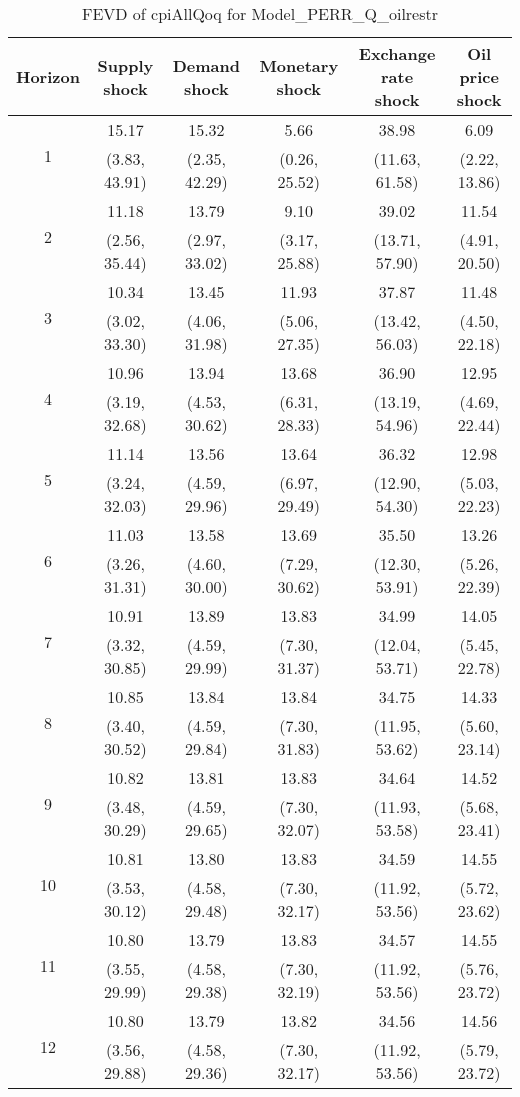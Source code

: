 \documentclass{article}
\begin{document}
\begin{table}
	\footnotesize
	\caption{FEVD of cpiAllQoq for Model_PERR_Q_oilrestr}
	\begin{tabular}{cccccc}
		Horizon & Supply shock & Demand shock & Monetary shock & Exchange rate shock & Oil price shock\\ \hline
		\multirow{2}{*}{1} & 15.17 & 15.32 & 5.66 & 38.98 & 6.09\\
		 & (3.83, 43.91) & (2.35, 42.29) & (0.26, 25.52) & (11.63, 61.58) & (2.22, 13.86)\\
		\multirow{2}{*}{2} & 11.18 & 13.79 & 9.10 & 39.02 & 11.54\\
		 & (2.56, 35.44) & (2.97, 33.02) & (3.17, 25.88) & (13.71, 57.90) & (4.91, 20.50)\\
		\multirow{2}{*}{3} & 10.34 & 13.45 & 11.93 & 37.87 & 11.48\\
		 & (3.02, 33.30) & (4.06, 31.98) & (5.06, 27.35) & (13.42, 56.03) & (4.50, 22.18)\\
		\multirow{2}{*}{4} & 10.96 & 13.94 & 13.68 & 36.90 & 12.95\\
		 & (3.19, 32.68) & (4.53, 30.62) & (6.31, 28.33) & (13.19, 54.96) & (4.69, 22.44)\\
		\multirow{2}{*}{5} & 11.14 & 13.56 & 13.64 & 36.32 & 12.98\\
		 & (3.24, 32.03) & (4.59, 29.96) & (6.97, 29.49) & (12.90, 54.30) & (5.03, 22.23)\\
		\multirow{2}{*}{6} & 11.03 & 13.58 & 13.69 & 35.50 & 13.26\\
		 & (3.26, 31.31) & (4.60, 30.00) & (7.29, 30.62) & (12.30, 53.91) & (5.26, 22.39)\\
		\multirow{2}{*}{7} & 10.91 & 13.89 & 13.83 & 34.99 & 14.05\\
		 & (3.32, 30.85) & (4.59, 29.99) & (7.30, 31.37) & (12.04, 53.71) & (5.45, 22.78)\\
		\multirow{2}{*}{8} & 10.85 & 13.84 & 13.84 & 34.75 & 14.33\\
		 & (3.40, 30.52) & (4.59, 29.84) & (7.30, 31.83) & (11.95, 53.62) & (5.60, 23.14)\\
		\multirow{2}{*}{9} & 10.82 & 13.81 & 13.83 & 34.64 & 14.52\\
		 & (3.48, 30.29) & (4.59, 29.65) & (7.30, 32.07) & (11.93, 53.58) & (5.68, 23.41)\\
		\multirow{2}{*}{10} & 10.81 & 13.80 & 13.83 & 34.59 & 14.55\\
		 & (3.53, 30.12) & (4.58, 29.48) & (7.30, 32.17) & (11.92, 53.56) & (5.72, 23.62)\\
		\multirow{2}{*}{11} & 10.80 & 13.79 & 13.83 & 34.57 & 14.55\\
		 & (3.55, 29.99) & (4.58, 29.38) & (7.30, 32.19) & (11.92, 53.56) & (5.76, 23.72)\\
		\multirow{2}{*}{12} & 10.80 & 13.79 & 13.82 & 34.56 & 14.56\\
		 & (3.56, 29.88) & (4.58, 29.36) & (7.30, 32.17) & (11.92, 53.56) & (5.79, 23.72)\\
	\end{tabular}
\label{tab:fevd-Model_PERR_Q_oilrestr-cpiAllQoq}
\end{table}
\end{document}
